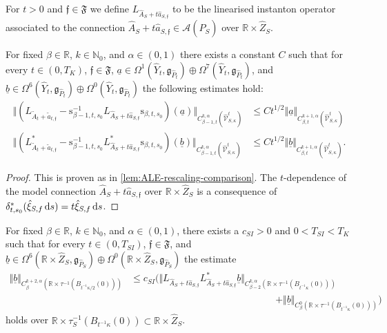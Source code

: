 \documentclass[11pt,a4paper]{scrartcl}
\newcommand*\diff{\mathop{}\!\textup{d}}
\newcommand{\VertWC}[3]{\Vert_{C^{{#1}}_{{#2}}{#3}}}
\newcommand{\VertWH}[3]{\Vert_{C^{{#1},\alpha}_{{#2}}{#3}}}
\newcommand{\VertWHt}[3]{\Vert_{C^{{#1},\alpha}_{{#2},t}{#3}}}
\numberwithin{equation}{section}
\theoremstyle{plain}
\theoremstyle{definition}
\theoremstyle{remark}
\begin{document}
 For $t>0$ and $\mathfrak{f} \in \mathfrak{F}$ we define $L_{\hat{A}_S+t\hat{a}_{S,\mathfrak{f}}}$ to be the linearised instanton operator associated to the connection $\hat{A}_S+t \hat{a}_{S,\mathfrak{f}} \in \mathcal{A}(\hat{P}_S)$ over $\mathbb{R}\times \hat{Z}_S$.
\begin{proposition}\label{prop:ALE-operator-comparison-family} 
For fixed $\beta\in \mathbb{R}$, $k\in \mathbb{N}_0$, and $\alpha\in(0,1)$ there exists a constant $C$ such that for every $t \in (0,T_K)$, $\mathfrak{f} \in \mathfrak{F}$, $\underline{a} \in \Omega^{1}(\hat{Y}_t,\mathfrak{g}_{\hat{P}_t}) \oplus \Omega^{7}(\hat{Y}_t,\mathfrak{g}_{\hat{P}_t})$, and $\underline{b} \in \Omega^{6}(\hat{Y}_t,\mathfrak{g}_{\hat{P}_t}) \oplus \Omega^{0}(\hat{Y}_t,\mathfrak{g}_{\hat{P}_t})$ the following estimates hold:
\begin{align*}
\Vert (L_{\tilde{A}_t+\tilde{a}_{t,\mathfrak{f}}} - \mathrm{s}_{\beta-1,t,s_0}^{-1} L_{\hat{A}_S+t \hat{a}_{S,\mathfrak{f}}} \mathrm{s}_{\beta,t,s_0})(\underline{a}) \VertWHt{k}{\beta-1}{(\hat{\mathcal{V}}_{S,\kappa}^t)}&\leq C t^{1/2} \Vert \underline{a} \VertWHt{k+1}{\beta}{(\hat{\mathcal{V}}_{S,\kappa}^t)}\\
\Vert (L_{\tilde{A}_t+\tilde{a}_{t,\mathfrak{f}}}^* - \mathrm{s}_{\beta-1,t,s_0}^{-1} L_{\hat{A}_S+t \hat{a}_{S,\mathfrak{f}}}^* \mathrm{s}_{\beta,t,s_0})(\underline{b}) \VertWHt{k}{\beta-1}{(\hat{\mathcal{V}}_{S,\kappa}^t)}&\leq C t^{1/2} \Vert \underline{b} \VertWHt{k+1}{\beta}{(\hat{\mathcal{V}}_{S,\kappa}^t)}.
\end{align*}
\end{proposition}
\begin{proof}
This is proven as in \autoref{lem:ALE-rescaling-comparison}. The $t$-dependence of the model connection $\hat{A}_S +t \hat{a}_{S,\mathfrak{f}}$ over $\mathbb{R}\times\hat{Z}_S$ is a consequence of $\delta_{t,s_0}^* (\hat{\xi}_{S,f}\diff s) = t \hat{\xi}_{S,f}\diff s$.
\end{proof}
\begin{proposition}\label{prop:Schauder-estimate-families-over-ALE}
For fixed $\beta\in \mathbb{R}$, $k\in \mathbb{N}_0$, and $\alpha \in (0,1)$, there exists a $c_{SI}>0$ and $0<T_{SI}<T_K$ such that for every $t \in (0,T_{SI})$, $\mathfrak{f} \in \mathfrak{F}$, and $\underline{b}\in \Omega^6(\mathbb{R}\times\hat{Z}_S,\mathfrak{g}_{\hat{P}_S}) \oplus \Omega^0(\mathbb{R}\times\hat{Z}_S,\mathfrak{g}_{\hat{P}_S})$ the estimate 
\begin{align*}
\Vert \underline{b} \VertWH{k+2}{\beta}{(\mathbb{R}\times\tau^{-1}(B_{t^{-1}\kappa/2}(0)))} &\leq c_{SI} \big(\Vert L_{\hat{A}_S+t \hat{a}_{S,\mathfrak{f}}} L_{\hat{A}_S+t \hat{a}_{S,\mathfrak{f}}}^* \underline{b} \VertWH{k}{\beta-2}{(\mathbb{R}\times\tau^{-1}(B_{t^{-1}\kappa}(0)))} \\
& \qquad \qquad \qquad \qquad\qquad\qquad \qquad \quad + \Vert \underline{b} \VertWC{0}{\beta}{(\mathbb{R}\times\tau^{-1}(B_{t^{-1}\kappa}(0)))} \big)  
\end{align*} 
holds over $\mathbb{R}\times\tau_S^{-1}(B_{t^{-1}\kappa}(0)) \subset \mathbb{R}\times \hat{Z}_S$.
\end{proposition}
\end{document}
